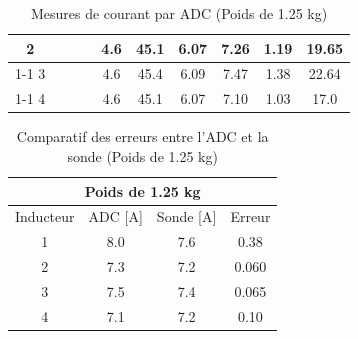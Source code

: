\begin{table}[H]
{\begin{tabular}{|c|c|c|c|c|c|c|c|c|c|}
            2         &                                                            &                           &                                                         & 4.6                                                      & 45.1                                                    & 6.07                                                                & 7.26                                                  & 1.19   & 19.65                                                              \\ \cline{1-1} \cline{5-10}
            3         &                                                            &                           &                                                         & 4.6                                                      & 45.4                                                    & 6.09                                                                & 7.47                                                  & 1.38   & 22.64                                                              \\ \cline{1-1} \cline{5-10}
            4         &                                                            &                           &                                                         & 4.6                                                      & 45.1                                                    & 6.07                                                                & 7.10                                                  & 1.03   & 17.0                                                               \\ \hline
        \end{tabular}%
    }
    \caption{Mesures de courant par ADC (Poids de 1.25 kg)}
    \label{tab:poids_1_25_adc}
\end{table}

\begin{table}[H]
    \centering
    \begin{tabular}{|c|c|c|c|}
        \hline
        \multicolumn{4}{|c|}{\textbf{Poids de 1.25 kg}}  \\ \hline
        Inducteur & ADC {[}A{]} & Sonde {[}A{]} & Erreur \\ \hline
        1         & 8.0         & 7.6           & 0.38   \\ \hline
        2         & 7.3         & 7.2           & 0.060  \\ \hline
        3         & 7.5         & 7.4           & 0.065  \\ \hline
        4         & 7.1         & 7.2           & 0.10   \\ \hline
    \end{tabular}
    \caption{Comparatif des erreurs entre l'ADC et la sonde (Poids de 1.25 kg)}
    \label{tab:poids_1_25_comp}
\end{table}

